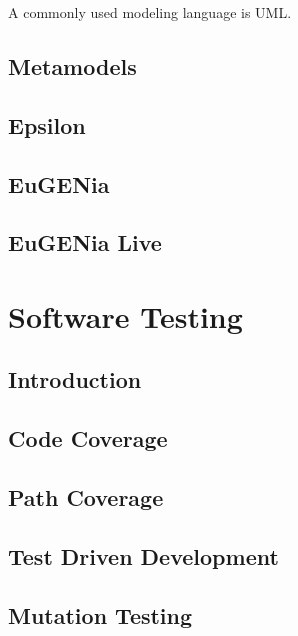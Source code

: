A commonly used modeling language is UML. 
\subsection{Metamodels}
\subsection{Epsilon}
\subsection{EuGENia}
\subsection{EuGENia Live}

\section{Software Testing}
\subsection{Introduction}
\subsection{Code Coverage}
\subsection{Path Coverage}
\subsection{Test Driven Development}
\subsection{Mutation Testing}

